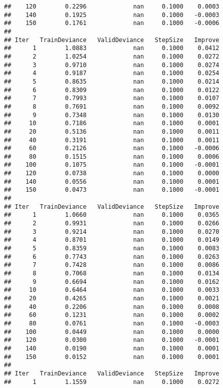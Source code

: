 \documentclass[]{article}
\begin{document}
\begin{verbatim}
##    120        0.2296             nan     0.1000    0.0003
##    140        0.1925             nan     0.1000   -0.0003
##    150        0.1761             nan     0.1000   -0.0006
## 
## Iter   TrainDeviance   ValidDeviance   StepSize   Improve
##      1        1.0883             nan     0.1000    0.0412
##      2        1.0254             nan     0.1000    0.0272
##      3        0.9710             nan     0.1000    0.0274
##      4        0.9187             nan     0.1000    0.0254
##      5        0.8635             nan     0.1000    0.0214
##      6        0.8309             nan     0.1000    0.0122
##      7        0.7993             nan     0.1000    0.0107
##      8        0.7691             nan     0.1000    0.0092
##      9        0.7348             nan     0.1000    0.0130
##     10        0.7186             nan     0.1000    0.0001
##     20        0.5136             nan     0.1000    0.0011
##     40        0.3191             nan     0.1000    0.0011
##     60        0.2126             nan     0.1000   -0.0006
##     80        0.1515             nan     0.1000    0.0006
##    100        0.1075             nan     0.1000   -0.0001
##    120        0.0738             nan     0.1000    0.0000
##    140        0.0556             nan     0.1000    0.0001
##    150        0.0473             nan     0.1000   -0.0001
## 
## Iter   TrainDeviance   ValidDeviance   StepSize   Improve
##      1        1.0660             nan     0.1000    0.0365
##      2        0.9931             nan     0.1000    0.0266
##      3        0.9214             nan     0.1000    0.0270
##      4        0.8701             nan     0.1000    0.0149
##      5        0.8359             nan     0.1000    0.0083
##      6        0.7743             nan     0.1000    0.0263
##      7        0.7428             nan     0.1000    0.0086
##      8        0.7068             nan     0.1000    0.0134
##      9        0.6694             nan     0.1000    0.0162
##     10        0.6464             nan     0.1000    0.0033
##     20        0.4265             nan     0.1000    0.0021
##     40        0.2206             nan     0.1000    0.0008
##     60        0.1231             nan     0.1000    0.0002
##     80        0.0761             nan     0.1000   -0.0003
##    100        0.0449             nan     0.1000    0.0000
##    120        0.0300             nan     0.1000   -0.0001
##    140        0.0190             nan     0.1000    0.0001
##    150        0.0152             nan     0.1000    0.0001
## 
## Iter   TrainDeviance   ValidDeviance   StepSize   Improve
##      1        1.1559             nan     0.1000    0.0272

\end{verbatim}
\end{document}

